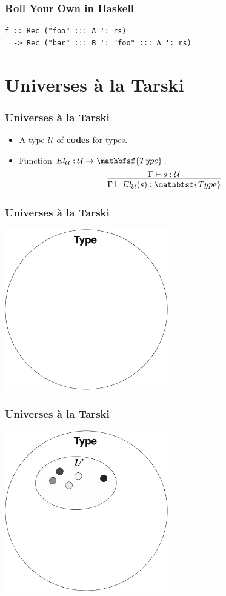 \documentclass[tikz, 12pt]{beamer}
\def\Type{\mathbfsf{Type}}
\begin{document}
\begin{frame}[fragile]
  \frametitle{Roll Your Own in Haskell}\pause
  \begin{lstlisting}
f :: Rec ("foo" ::: A ': rs)
  -> Rec ("bar" ::: B ': "foo" ::: A ': rs)
  \end{lstlisting}
\end{frame}

\section{Universes \`a la Tarski}

\begin{frame}
  \frametitle{Universes \`a la Tarski}\pause
  \begin{itemize}
    \item A type $\mathcal{U}$ of \textbf{codes} for types.
      \pause
    \item Function $El_\mathcal{U} : \mathcal{U}\to\Type$.
      \pause
      \[
        \infer{
          \Gamma\vdash El_\mathcal{U}(s) : \Type
        }{
          \Gamma\vdash s : \mathcal{U}
        }
      \]
  \end{itemize}
\end{frame}

\begin{frame}
  \frametitle{Universes \`a la Tarski}
  \begin{center}
    \includegraphics[width=2.8in]{universe-empty.pdf}
  \end{center}
\end{frame}

\begin{frame}
  \frametitle{Universes \`a la Tarski}
  \begin{center}
    \includegraphics[width=2.8in]{universe-embedded.pdf}
  \end{center}
\end{frame}
\end{document}
